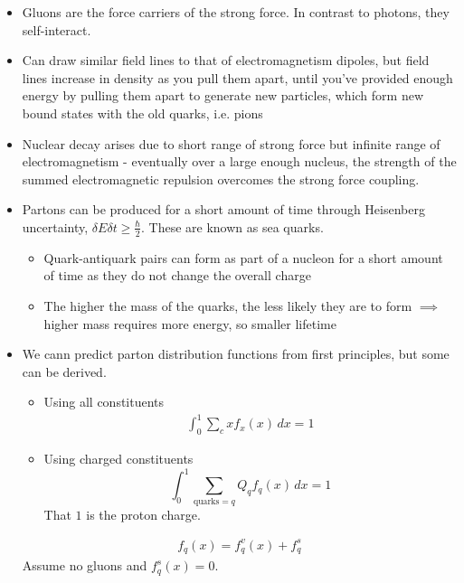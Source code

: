 \documentclass[a4paper, 11pt, normalem]{report}
\begin{document}
\begin{itemize}
    \item Gluons are the force carriers of the strong force. 
        In contrast to photons, they self-interact.
    \item Can draw similar field lines to that of electromagnetism dipoles, but field lines increase in density as you pull them apart, until you've provided enough energy by pulling them apart to generate new particles, which form new bound states with the old quarks, i.e. pions
    \item Nuclear decay arises due to short range of strong force but infinite range of electromagnetism - eventually over a large enough nucleus, the strength of the summed electromagnetic repulsion overcomes the strong force coupling.
    \item Partons can be produced for a short amount of time through Heisenberg uncertainty, $\delta E\delta t \geq \frac{\hbar}{2}$. 
        These are known as sea quarks.
        \begin{itemize}
            \item Quark-antiquark pairs can form as part of a nucleon for a short amount of time as they do not change the overall charge
            \item The higher the mass of the quarks, the less likely they are to form $\implies$ higher mass requires more energy, so smaller lifetime
        \end{itemize}
    \item We cann predict parton distribution functions from first principles, but some can be derived.
        \begin{itemize}
            \item Using all constituents
                \begin{align}
                    \int_0^1 \sum_c xf_x(x)\,dx = 1
                \end{align}
            \item Using charged constituents
                \begin{equation}
                    \int_0^1 \sum_{\text{quarks} = q} Q_qf_q(x)\,dx = 1
                \end{equation}
                That $1$ is the proton charge.
        \end{itemize}
        \begin{align}
            f_q(x) = f_q^v(x) + f_q^s
        \end{align}
        Assume no gluons and $f_q^s(x) = 0$.
        \begin{figure}[H]

\end{figure}
\end{itemize}
\end{document}
